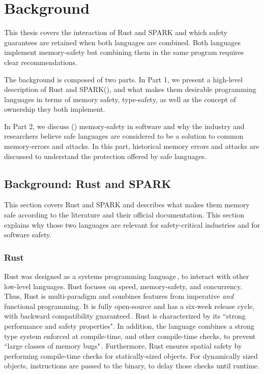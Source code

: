 \documentclass[nomenclature, english, bibtex]{kththesis}
\begin{document}
\cleardoublepage\chapter{Background}
\label{ch:background}

This thesis covers the interaction of Rust and SPARK and which safety guarantees are retained when both languages are combined. Both languages implement \gls{memory-safety} but combining them in the same program requires clear recommendations. 

The background is composed of two parts. 
In Part 1, we present a 
high-level description of Rust and SPARK(), and what makes them desirable programming languages in terms of memory safety, \gls{type-safety}, as well as the concept of \gls{ownership} they both implement.

In Part 2, we discuss () \gls{memory-safety} in software and why the industry and researchers believe safe languages are considered to be a solution to common \gls{memory-error}s and attacks. In this part, historical memory errors and attacks are discussed to understand the protection offered by safe languages. 

\section{Background: Rust and SPARK}
\label{sec:rust_and_spark}

This section covers Rust and SPARK and describes what makes them memory safe according to the literature and their official documentation. This section explains why those two languages are relevant for \gls{safety-critical} industries and for software safety.


\subsection{Rust}

Rust was designed as a systems programming language\,\cite{mergendahl_cross-language_2022}, to interact with other low-level languages. Rust focuses on speed, \gls{memory-safety}, and concurrency. Thus, Rust is multi-paradigm and combines features from imperative \textit{and} functional programming. It is fully open-source and has a six-week release cycle, with backward compatibility guaranteed\,\cite{poveda_ruiz_bounded_2019,noauthor_rust_nodate}. Rust is characterized by its ``strong performance and safety properties". In addition, the language combines a strong type system enforced at compile-time, and other compile-time checks, to prevent ``large classes of memory bugs"\,\cite{mergendahl_cross-language_2022}. Furthermore, Rust ensures spatial safety by performing compile-time checks for statically-sized objects. For dynamically sized objects, instructions are passed to the binary, to delay those checks until runtime.
\end{document}
